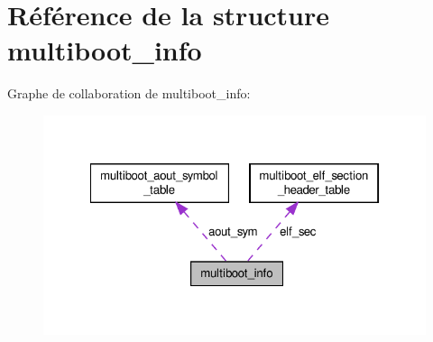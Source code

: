 \hypertarget{structmultiboot__info}{\section{Référence de la structure multiboot\+\_\+info}
\label{structmultiboot__info}
}


Graphe de collaboration de multiboot\+\_\+info\+:\nopagebreak
\begin{figure}[H]
\begin{center}
\leavevmode
\includegraphics[width=322pt]{structmultiboot__info__coll__graph}
\end{center}
\end{figure}
